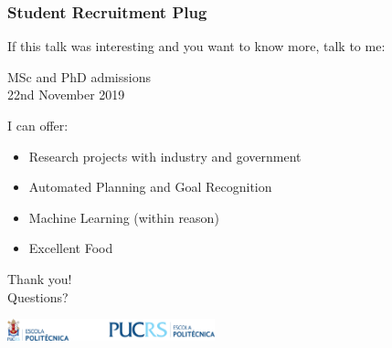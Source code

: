 \documentclass[usenames,dvipsnames]{beamer}
\begin{document}

\begin{frame}[c]\frametitle{Student Recruitment Plug}
	If this talk was interesting and you want to know more, talk to me:\\[2em]
	\begin{center}
		{\Large
		MSc and PhD admissions \\[2em] 22nd November 2019
		}
	\end{center}
	I can offer:
	\begin{itemize}
		\item Research projects with industry and government
		\item Automated Planning and Goal Recognition
		\item Machine Learning (within reason)
		\item Excellent Food
	\end{itemize}
\end{frame}



	{
    \begin{frame}[c]{}
    		\centering
    		Thank you!
			\\
			Questions?
			\begin{center}
				\includegraphics[width=6cm]{politecnica.pdf}
			\end{center}
    \end{frame}
    }

\end{document}
